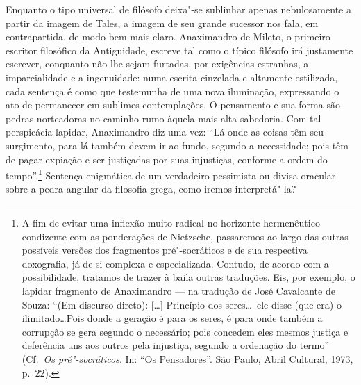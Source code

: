 Enquanto o tipo universal de filósofo deixa"-se sublinhar apenas nebulosamente
a partir da imagem de Tales, a imagem de seu grande sucessor nos fala, em
contrapartida, de modo bem mais claro. Anaximandro de Mileto, o primeiro
escritor filosófico da \label{primeiroescritor} Antiguidade, escreve tal
como o típico filósofo irá justamente escrever, conquanto não lhe sejam
furtadas, por exigências estranhas, a imparcialidade e a ingenuidade: numa
escrita cinzelada e altamente estilizada, cada sentença é como que testemunha
de uma nova iluminação, expressando o ato de permanecer em sublimes
contemplações. O pensamento e sua forma são pedras norteadoras no caminho
rumo àquela mais alta sabedoria. Com tal perspicácia lapidar, Anaximandro diz
uma vez: ``Lá \label{laondeascoisas} onde as coisas têm seu surgimento,
para lá também devem ir ao fundo, segundo a necessidade; pois têm de pagar
expiação e ser justiçadas por suas injustiças, conforme a ordem do
tempo''.\footnote{A fim de evitar uma inflexão muito radical no horizonte
hermenêutico condizente com as ponderações de Nietzsche, passaremos ao largo
das outras possíveis versões dos fragmentos pré"-socráticos e de sua
respectiva doxografia, já de si complexa e especializada. Contudo, de acordo
com a possibilidade, tratamos de trazer à baila outras traduções. Eis, por
exemplo, o lapidar fragmento de Anaximandro --- na tradução de José Cavalcante
de Souza: ``(Em discurso direto): [\ldots] Princípio dos seres\ldots\ ele
disse (que era) o ilimitado\ldots Pois donde a geração é para os seres, é
para onde também a corrupção se gera segundo o necessário; pois concedem eles
mesmos justiça e deferência uns aos outros pela injustiça, segundo a
ordenação do termo'' (Cf.~\textit{Os pré"-socráticos}. In: ``Os Pensadores''.
São Paulo, Abril Cultural, 1973, p.~22).} Sentença enigmática de um
verdadeiro pessimista ou divisa oracular sobre a pedra angular da filosofia
grega, como iremos interpretá"-la?

